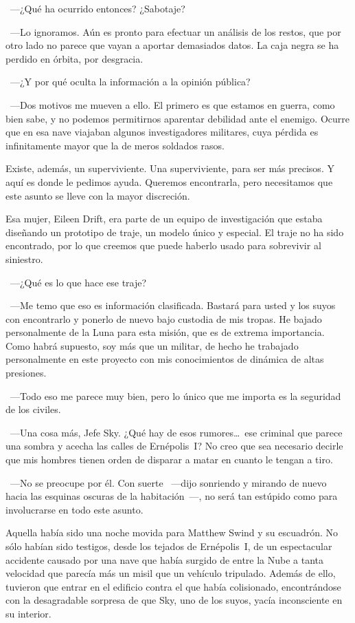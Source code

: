 ~---¿Qué ha ocurrido entonces? ¿Sabotaje?

~---Lo ignoramos. Aún es pronto para efectuar un análisis de los restos, que por otro lado no parece que vayan a aportar demasiados datos. La caja negra se ha perdido en órbita, por desgracia.

~---¿Y por qué oculta la información a la opinión pública?

~---Dos motivos me mueven a ello. El primero es que estamos en guerra, como bien sabe, y no podemos permitirnos aparentar debilidad ante el enemigo. Ocurre que en esa nave viajaban algunos investigadores militares, cuya pérdida es infinitamente mayor que la de meros soldados rasos.

\rquoti Existe, además, un superviviente. Una superviviente, para ser más precisos. Y aquí es donde le pedimos ayuda. Queremos encontrarla, pero necesitamos que este asunto se lleve con la mayor discreción.

\rquoti Esa mujer, Eileen Drift, era parte de un equipo de investigación que estaba diseñando un prototipo de traje, un modelo único y especial. El traje no ha sido encontrado, por lo que creemos que puede haberlo usado para sobrevivir al siniestro.

~---¿Qué es lo que hace ese traje?

~---Me temo que eso es información clasificada. Bastará para usted y los suyos con encontrarlo y ponerlo de nuevo bajo custodia de mis tropas. He bajado personalmente de la Luna para esta misión, que es de extrema importancia. Como habrá supuesto, soy más que un militar, de hecho he trabajado personalmente en este proyecto con mis conocimientos de dinámica de altas presiones.

~---Todo eso me parece muy bien, pero lo único que me importa es la seguridad de los civiles.

~---Una cosa más, Jefe Sky. ¿Qué hay de esos rumores\dots\ ese criminal que parece una sombra y acecha las calles de Ernépolis~I? No creo que sea necesario decirle que mis hombres tienen orden de disparar a matar en cuanto le tengan a tiro.

~---No se preocupe por él. Con suerte ~---dijo sonriendo y mirando de nuevo hacia las esquinas oscuras de la habitación~---, no será tan estúpido como para involucrarse en todo este asunto.

\parbreak
Aquella había sido una noche movida para Matthew Swind y su escuadrón. No sólo habían sido testigos, desde los tejados de Ernépolis~I, de un espectacular accidente causado por una nave que había surgido de entre la Nube a tanta velocidad que parecía más un misil que un vehículo tripulado. Además de ello, tuvieron que entrar en el edificio contra el que había colisionado, encontrándose con la desagradable sorpresa de que Sky, uno de los suyos, yacía inconsciente en su interior.

